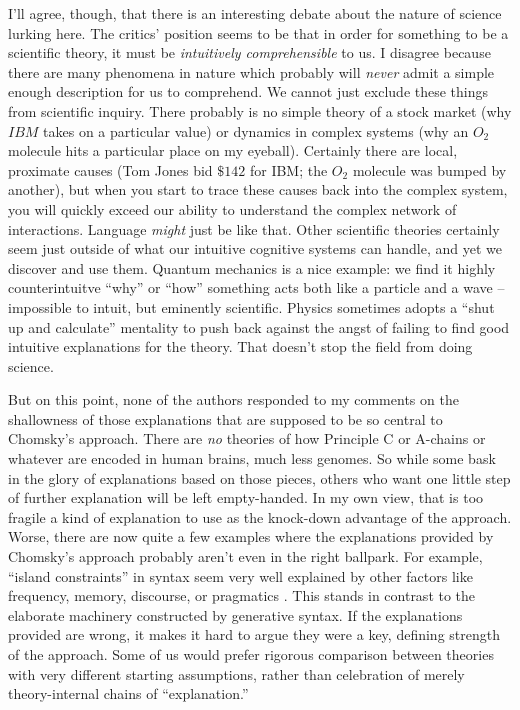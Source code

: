 \documentclass[output=paper,colorlinks,citecolor=brown
]{langscibook}
\begin{document}
I'll agree, though, that there is an interesting debate about the nature of science lurking here. The critics' position seems to be that in order for something to be a scientific theory, it must be \textit{intuitively comprehensible} to us. I disagree because there are many phenomena in nature which probably will \textit{never} admit a simple enough description for us to comprehend. We cannot just exclude these things from scientific inquiry. There probably is no simple theory of a stock market (why $IBM$ takes on a particular value) or dynamics in complex systems (why an $O_2$ molecule hits a particular place on my eyeball). Certainly there are local, proximate causes (Tom Jones bid  $\$142$ for IBM; the $O_2$ molecule was bumped by another), but when you start to trace these causes back into the complex system, you will quickly exceed our ability to understand the complex network of interactions. Language \textit{might} just be like that. Other scientific theories certainly seem just outside of what our intuitive cognitive systems can handle, and yet we discover and use them. Quantum mechanics is a nice example: we find it highly counterintuitve ``why'' or ``how'' something acts both like a particle and a wave -- impossible to intuit, but eminently scientific. Physics sometimes adopts a ``shut up and calculate'' mentality \citep{david1989s} to push back against the angst of failing to find good intuitive explanations for the theory. That doesn't stop the field from doing science. 

But on this point, none of the authors responded to my comments on the shallowness of those explanations that are supposed to be so central to Chomsky's approach. There are \textit{no} theories of how Principle C or A-chains or whatever are encoded in human brains, much less genomes. So while some bask in the glory of explanations based on those pieces, others who want one little step of further explanation will be left empty-handed. In my own view, that is too fragile a kind of explanation to use as the knock-down advantage of the approach. Worse, there are now quite a few examples where the explanations provided by Chomsky's approach probably aren't even in the right ballpark. For example, ``island constraints'' in syntax seem very well explained by other factors like frequency, memory, discourse, or pragmatics \citep{kluender1992deriving,kluender1993subjacency,kehler2002coherence,chaves2020unbounded,goldberg2006constructions,liu2022structural,winckel2021french,ambridge2008island,abeille2020extraction,liu2022structural,liu2022verb,cuneo2023discourse}. This stands in contrast to the elaborate machinery constructed by generative syntax. If the explanations provided are wrong, it makes it hard to argue they were a key, defining strength of the approach. Some of us would prefer rigorous comparison between theories with very different starting assumptions, rather than celebration of merely theory-internal chains of ``explanation.''
\end{document}
